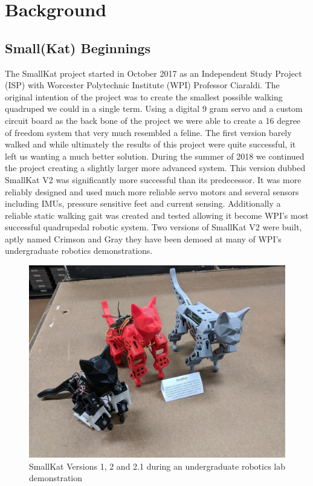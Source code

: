 \graphicspath{ {./figures/} }
\section{Background}
\label{chap:background}
\subsection*{Small(Kat) Beginnings}
 The SmallKat project started in October 2017 as an Independent Study Project (ISP) with Worcester Polytechnic Institute (WPI) Professor Ciaraldi. The original intention of the project was to create the smallest possible walking quadruped we could in a single term. Using a digital 9 gram servo and a custom circuit board as the back bone of the project we were able to create a 16 degree of freedom system that very much resembled a feline. The first version barely walked and while ultimately the results of this project were quite successful, it left us wanting a much better solution. During the summer of 2018 we continued the project creating a slightly larger more advanced system. This version dubbed SmallKat V2 was significantly more successful than its predecessor. It was more reliably designed and used much more reliable servo motors and several sensors including IMUs, pressure sensitive feet and current sensing. Additionally a reliable static walking gait was created and tested allowing it become WPI's most successful quadrupedal robotic system. Two versions of SmallKat V2 were built, aptly named Crimson and Gray they have been demoed at many of WPI's undergraduate robotics demonstrations. 
 
     \begin{figure}[H]
        \centering
        \includegraphics[width=120mm]{figures/V1andV2.jpg}
        \caption{SmallKat Versions 1, 2 and 2.1 during an undergraduate robotics lab demonstration}
        \label{fig:my_label}
    \end{figure}
